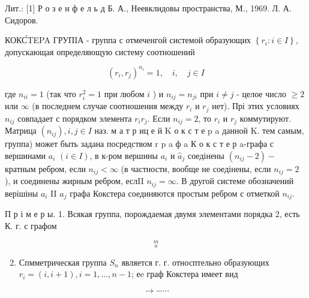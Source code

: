 \documentclass[10pt]{article}
\begin{document}
Лит.: [1] Р о з е н ф е л ь д Б. А., Неевклидовы пространства, М., 1969. Л. А. Сидоров.



КОКС́TEPA ГРУПIА - группа с отмеченгой системой образующих $\left\{r_{i}: i \in I\right\}$, допускающая определяющую систему соотношений



\[

\left(r_{i}, r_{j}\right)^{n_{i}}=1, \quad i, \quad j \in I

\]



где $n_{i i}=1$ (так что $r_{i}^{2}=1$ при любом $i$ ) и $n_{i j}=n_{j i}$ при $i \neq j$ - целое число $\geqslant 2$ или $\infty$ (в последнем случае соотношения между $r_{i}$ и $r_{j}$ нет). Прі этих условиях $n_{i j}$ совпадает с порядком элемента $r_{i} r_{j}$. Если $n_{i j}=2$, то $r_{i}$ и $r_{j}$ коммутируют. Матрица $\left(n_{i j}\right), i, j \in I$ наз. м а т р иц е й K о к с т е p a данной K. тем самым, группа) может быть задана посредством r p a ф a К о к с т е р a-графа с вершинами $a_{i}$ $(i \in I)$, в к-ром вершины $a_{i}$ и $\hat{a}_{j}$ соедінены $\left(n_{i j}-2\right)-$ кратным ребром, если $n_{i j}<\infty$ (в частности, вообще не соедінены, если $n_{i j}=2$ ), и соединены жирным ребром, еслII $n_{i j}=\infty$. В другой системе обозначений верішіны $a_{i}$ II $a_{j}$ графа Кокстера соединяются простым ребром с отметкой $n_{i j}$.



П р і м е р ы. 1. Всякая группа, порождаемая двумя элементами порядка 2, есть К. г. с графом



\[

\stackrel{m}{\circ}

\]



\begin{enumerate}

  \setcounter{enumi}{1}

  \item Спмметрическая группа $S_{n}$ является г. г. относптельно образующих $r_{i}=(i, i+1), i=1, \ldots, n-1$; еe граф Кокстера имеет вид

\end{enumerate}



\[

\longrightarrow-\cdots

\]
\end{document}
